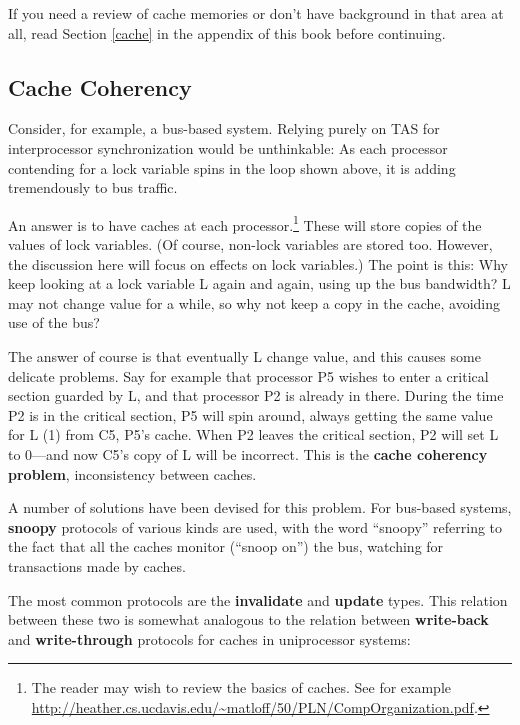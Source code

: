 If you need a review of cache memories or don't have background in that
area at all, read Section \ref{cache} in the appendix of this book
before continuing.

\subsection{Cache Coherency}
\label{cachecoherency}

Consider, for example, a bus-based system. Relying purely on TAS for
interprocessor synchronization would be unthinkable: As each processor
contending for a lock variable spins in the loop shown above, it is
adding tremendously to bus traffic.

An answer is to have caches at each processor.\footnote{The reader may
wish to review the basics of caches.  See for example 
\url{http://heather.cs.ucdavis.edu/~matloff/50/PLN/CompOrganization.pdf}.}
These will store copies of the values of lock variables.  (Of course,
non-lock variables are stored too.  However, the discussion here will
focus on effects on lock variables.) The point is this: Why keep looking
at a lock variable L again and again, using up the bus bandwidth? L may
not change value for a while, so why not keep a copy in the cache,
avoiding use of the bus?

The answer of course is that eventually L  change value,
and this causes some delicate problems. Say for example that processor
P5 wishes to enter a critical section guarded by L, and that processor
P2 is already in there. During the time P2 is in the critical section,
P5 will spin around, always getting the same value for L (1) from C5,
P5's cache. When P2 leaves the critical section, P2 will set L to
0---and now C5's copy of L will be incorrect. This is the \textbf{cache
coherency problem}, inconsistency between caches.

A number of solutions have been devised for this problem. For bus-based
systems, \textbf{snoopy} protocols of various kinds are used, with the
word ``snoopy'' referring to the fact that all the caches monitor
(``snoop on'') the bus, watching for transactions made by
 caches.

The most common protocols are the \textbf{invalidate} and
\textbf{update} types.  This relation between these two is somewhat
analogous to the relation between \textbf{write-back} and
\textbf{write-through} protocols for caches in uniprocessor systems:

